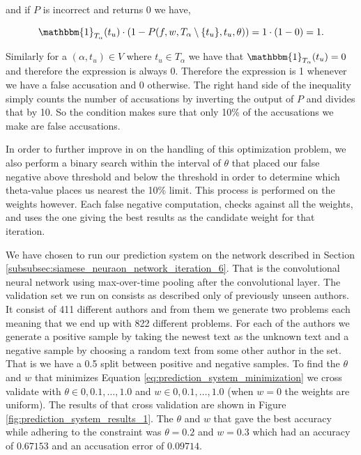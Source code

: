 and if $P$ is incorrect and returns 0 we have,

\begin{equation}
    \mathbbm{1}_{T_\alpha}(t_u) \cdot
    \left(1 - P(f, w, T_\alpha \setminus \{t_u\}, t_u, \theta)\right) =
    1 \cdot (1 - 0) = 1.
\end{equation}

Similarly for a $(\alpha, t_u) \in V$ where $t_u \in T_\alpha$ we have that
$\mathbbm{1}_{T_\alpha}(t_u) = 0$ and therefore the expression is always
0. Therefore the expression is 1 whenever we have a false accusation and 0
otherwise. The right hand side of the inequality simply counts the number of
accusations by inverting the output of $P$ and divides that by 10. So the
condition makes sure that only 10\% of the accusations we make are false
accusations.

In order to further improve in on the handling of this optimization problem, we
also perform a binary search within the interval of $\theta$ that placed our
false negative above threshold and below the threshold in order to determine
which theta-value places us nearest the 10\% limit. This process is performed
on the weights however. Each false negative computation, checks against all the
weights, and uses the one giving the best results as the candidate weight for
that iteration.

We have chosen to run our prediction system on the network described in Section
\ref{subsubsec:siamese_neuraon_network_iteration_6}. That is the convolutional
neural network using max-over-time pooling after the convolutional layer.
The validation set we run on consists as described only of previously unseen
authors. It consist of 411 different authors and from them we generate two
problems each meaning that we end up with 822 different problems. For each
of the authors we generate a positive sample by taking the newest text as
the unknown text and a negative sample by choosing a random text from some
other author in the set. That is we have a 0.5 split between positive and
negative samples. To find the $\theta$ and $w$ that minimizes Equation
\ref{eq:prediction_system_minimization} we cross validate with $\theta \in
0, 0.1, \dots, 1.0$ and $w \in 0, 0.1, \dots, 1.0$ (when $w = 0$ the weights
are uniform). The results of that cross validation are shown in Figure
\ref{fig:prediction_system_results_1}. The $\theta$ and $w$ that gave the best
accuracy while adhering to the constraint was $\theta = 0.2$ and $w = 0.3$ which
had an accuracy of $0.67153$ and an accusation error of $0.09714$.

